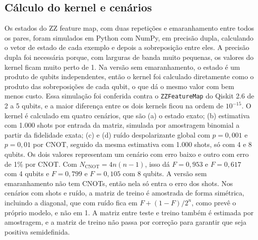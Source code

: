 \documentclass[conference]{IEEEtran}
\begin{document}
\subsection{Cálculo do kernel e cenários}
Os estados do ZZ feature map, com duas repetições e emaranhamento entre todos os pares, foram simulados em Python com NumPy, em precisão dupla, calculando o vetor de estado de cada exemplo e depois a sobreposição entre eles. A precisão dupla foi necessária porque, com larguras de banda muito pequenas, os valores do kernel ficam muito perto de 1. Na versão sem emaranhamento, o estado é um produto de qubits independentes, então o kernel foi calculado diretamente como o produto das sobreposições de cada qubit, o que dá o mesmo valor com bem menos custo. Essa simulação foi conferida contra o \texttt{ZZFeatureMap} do Qiskit 2.6 \cite{qiskit2024} de 2 a 5 qubits, e a maior diferença entre os dois kernels ficou na ordem de $10^{-15}$. O kernel é calculado em quatro cenários, que são (a) o estado exato; (b) estimativa com 1.000 shots por entrada da matriz, simulada por amostragem binomial a partir da fidelidade exata; (c) e (d) ruído despolarizante global com $p = 0{,}001$ e $p = 0{,}01$ por CNOT, seguido da mesma estimativa com 1.000 shots, só com 4 e 8 qubits. Os dois valores representam um cenário com erro baixo e outro com erro de 1\% por CNOT. Com $N_{\mathrm{CNOT}} = 4n(n-1)$, isso dá $F = 0{,}953$ e $F = 0{,}617$ com 4 qubits e $F = 0{,}799$ e $F = 0{,}105$ com 8 qubits. A versão sem emaranhamento não tem CNOTs, então nela só entra o erro dos shots. Nos cenários com shots e ruído, a matriz de treino é amostrada de forma simétrica, incluindo a diagonal, que com ruído fica em $F + (1-F)/2^n$, como prevê o próprio modelo, e não em 1. A matriz entre teste e treino também é estimada por amostragem, e a matriz de treino não passa por correção para garantir que seja positiva semidefinida.
\end{document}
